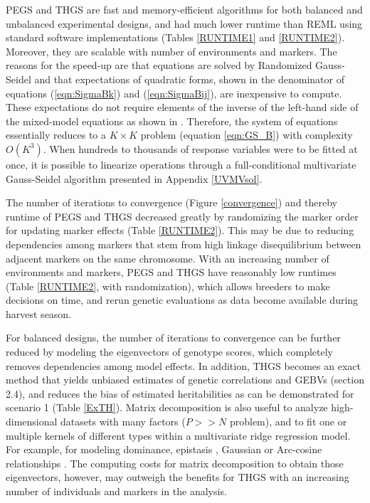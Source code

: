 \documentclass{bmcart}
\begin{document}
PEGS and THGS are fast and memory-efficient algorithms for both balanced and unbalanced experimental designs, and had much lower runtime than REML using standard software implementations (Tables \ref{RUNTIME1} and \ref{RUNTIME2}). Moreover, they are scalable with number of environments and markers. The reasons for the speed-up are that equations are solved by Randomized Gauss-Seidel and that expectations of quadratic forms, shown in the denominator of equations (\ref{eqn:SigmaBk}) and (\ref{eqn:SigmaBij}), are inexpensive to compute. These expectations do not require elements of the inverse of the left-hand side of the mixed-model equations as shown in \cite{Schaeffer}. Therefore, the system of equations essentially reduces to a $K\times K$ problem (equation \ref{eqn:GS_B}) with complexity $O(K^3)$. When hundreds to thousands of response variables were to be fitted at once, it is possible to linearize operations through a full-conditional multivariate Gauss-Seidel algorithm presented in Appendix \ref{UVMVsol}.

The number of iterations to convergence (Figure \ref{convergence}) and thereby runtime of PEGS and THGS decreased greatly by randomizing the marker order for updating marker effects (Table \ref{RUNTIME2}).  This may be due to reducing dependencies among markers that stem from high linkage disequilibrium between adjacent markers on the same chromosome. With an increasing number of environments and markers, PEGS and THGS have reasonably low runtimes (Table \ref{RUNTIME2}, with randomization), which allows breeders to make decisions on time, and rerun genetic evaluations as data become available during harvest season.

For balanced designs, the number of iterations to convergence can be further reduced by modeling the eigenvectors of genotype scores, which completely removes dependencies among model effects. In addition, THGS becomes an exact method that yields unbiased estimates of genetic correlations and GEBVs (section 2.4), and reduces the bias of estimated heritabilities as can be demonstrated for scenario 1 (Table \ref{ExTH}). Matrix decomposition is also useful to analyze high-dimensional datasets with many factors ($P>>N$ problem), and to fit one or multiple kernels of different types within a multivariate ridge regression model. For example, for modeling dominance, epistasis \cite{Xu2013}, Gaussian or Arc-cosine relationships \cite{Xavier2021,Kernel2021}. The computing costs for matrix decomposition to obtain those eigenvectors, however, may outweigh the benefits for THGS with an increasing number of individuals and markers in the analysis.
\end{document}
